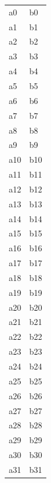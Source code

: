 \documentclass{article}
\begin{document}
\begin{tabular}{ll}
a0 & b0 \\
a1 & b1 \\
a2 & b2 \\
a3 & b3 \\
a4 & b4 \\
a5 & b5 \\
a6 & b6 \\
a7 & b7 \\
a8 & b8 \\
a9 & b9 \\
a10 & b10 \\
a11 & b11 \\
a12 & b12 \\
a13 & b13 \\
a14 & b14 \\
a15 & b15 \\
a16 & b16 \\
a17 & b17 \\
a18 & b18 \\
a19 & b19 \\
a20 & b20 \\
a21 & b21 \\
a22 & b22 \\
a23 & b23 \\
a24 & b24 \\
a25 & b25 \\
a26 & b26 \\
a27 & b27 \\
a28 & b28 \\
a29 & b29 \\
a30 & b30 \\
a31 & b31
\end{tabular}
\end{document}
